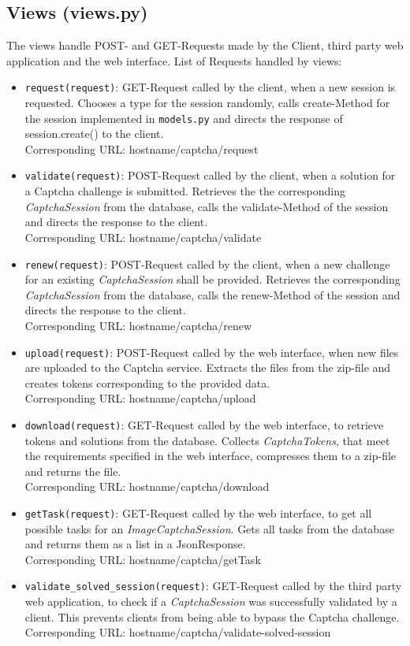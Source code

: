 \clearpage
\subsection{Views (views.py)}

The views handle POST- and GET-Requests made by the Client, third party web application and the web interface. List of Requests handled by views:

\begin{itemize}
\item \verb|request(request)|: GET-Request called by the client, when a new session is requested. Chooses a type for the session randomly, calls create-Method for the session implemented in \verb|models.py| and directs the response of session.create() to the client.\\
Corresponding URL: hostname/captcha/request
\item \verb|validate(request)|: POST-Request called by the client, when a solution for a Captcha challenge is submitted. Retrieves the the corresponding \emph{CaptchaSession} from the database, calls the validate-Method of the session and directs the response to the client. \\
Corresponding URL: hostname/captcha/validate
\item \verb|renew(request)|: POST-Request called by the client, when a new challenge for an existing \emph{CaptchaSession} shall be provided. Retrieves the corresponding \emph{CaptchaSession} from the database, calls the renew-Method of the session and directs the response to the client. \\
Corresponding URL: hostname/captcha/renew
\item \verb|upload(request)|: POST-Request called by the web interface, when new files are uploaded to the Captcha service. Extracts the files from the zip-file and creates tokens corresponding to the provided data.\\
Corresponding URL: hostname/captcha/upload
\item \verb|download(request)|: GET-Request called by the web interface, to retrieve tokens and solutions from the database. Collects \emph{CaptchaTokens}, that meet the requirements specified in the web interface, compresses them to a zip-file and returns the file.\\
Corresponding URL: hostname/captcha/download
\item \verb|getTask(request)|: GET-Request called by the web interface, to get all possible tasks for an \emph{ImageCaptchaSession}. Gets all tasks from the database and returns them as a list in a JsonResponse.\\
Corresponding URL: hostname/captcha/getTask
\item \verb|validate_solved_session(request)|: GET-Request called by the third party web application, to check if a \emph{CaptchaSession} was successfully validated by a client. This prevents clients from being able to bypass the Captcha challenge.
Corresponding URL: hostname/captcha/validate-solved-session
\end{itemize}

\clearpage
